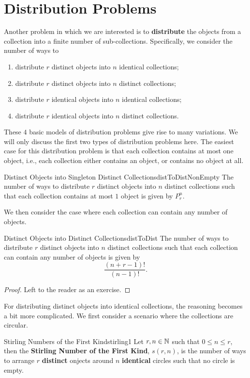 \documentclass[math]{amznotes}
\theoremstyle{remark}
\begin{document}
\section{Distribution Problems}
Another problem in which we are interested is to \textbf{distribute} the objects from a collection into a finite number of sub-collections. Specifically, we consider the number of ways to
\begin{enumerate}
    \item distribute $r$ distinct objects into $n$ identical collections;
    \item distribute $r$ distinct objects into $n$ distinct collections;
    \item distribute $r$ identical objects into $n$ identical collections;
    \item distribute $r$ identical objects into $n$ distinct collections.
\end{enumerate}
These $4$ basic models of distribution problems give rise to many variations. We will only discuss the first two types of distribution problems here. The easiest case for this distribution problem is that each collection contains at most one object, i.e., each collection either contains an object, or contains no object at all.
\begin{probox}{Distinct Objects into Singleton Distinct Collections}{distToDistNonEmpty}
    The number of ways to distribute $r$ distinct objects into $n$ distinct collections such that each collection contains at most $1$ object is given by $P^n_r$.
\end{probox}
We then consider the case where each collection can contain any number of objects.
\begin{probox}{Distinct Objects into Distinct Collections}{distToDist}
    The number of ways to distribute $r$ distinct objects into $n$ distinct collections such that each collection can contain any number of objects is given by
    \begin{equation*}
        \frac{(n + r - 1)!}{(n - 1)!}.
    \end{equation*}
    \tcblower
    \begin{proof}
        Left to the reader as an exercise.
    \end{proof}
\end{probox}
For distributing distinct objects into identical collections, the reasoning becomes a bit more complicated. We first consider a scenario where the collections are circular.
\begin{dfnbox}{Stirling Numbers of the First Kind}{stirling1}
    Let $r, n \in \mathbb{N}$ such that $0 \leq n \leq r$, then the {\color{red} \textbf{Stirling Number of the First Kind}}, $s(r, n)$, is the number of ways to arrange $r$ {\color{red} \textbf{distinct}} onjects around $n$ {\color{red} \textbf{identical}} circles such that no circle is empty.
\end{dfnbox}
\end{document}

